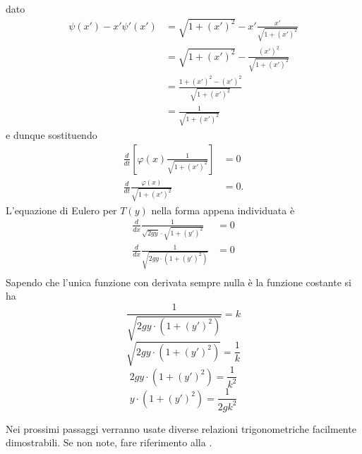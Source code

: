 dato
\begin{align*}
	\psi(x') - x'\psi'(x') &= \sqrt{1 + (x')^2} - x' \frac{x'}{\sqrt{1 + (x')^2}}\\
	&= \sqrt{1 + (x')^2} - \frac{(x')^2}{\sqrt{1 + (x')^2}}\\
	&= \frac{1 + (x')^2 - (x')^2}{\sqrt{1 + (x')^2}}\\
	&= \frac{1}{\sqrt{1 + (x')^2}}
\end{align*}
e dunque sostituendo
\begin{align*}
	\frac{d}{dt}\left[ \varphi(x)\frac{1}{\sqrt{1 + (x')^2}} \right] &= 0\\
	\frac{d}{dt} \frac{\varphi(x)}{\sqrt{1 + (x')^2}} &= 0.
\end{align*}
L'equazione di Eulero per $T(y)$ nella forma appena individuata è
\begin{align*}
	\frac{d}{dx} \frac{1}{\sqrt{2gy} \cdot \sqrt{1 + (y')^2}} &= 0\\
	\frac{d}{dx} \frac{1}{\sqrt{2gy \cdot (1 + (y')^2)}} &= 0\\
\end{align*}
Sapendo che l'unica funzione con derivata sempre nulla è la funzione costante si ha
\[ \frac{1}{\sqrt{2gy \cdot (1 + (y')^2)}} = k \]
\[ \sqrt{2gy \cdot (1 + (y')^2)} = \frac{1}{k} \]
\[ 2gy \cdot (1 + (y')^2) = \frac{1}{k^2} \]
\[ y \cdot (1 + (y')^2) = \frac{1}{2gk^2} \]

\begin{note}
	Nei prossimi passaggi verranno usate diverse relazioni trigonometriche facilmente dimostrabili. Se non note, fare riferimento alla .
\end{note}

